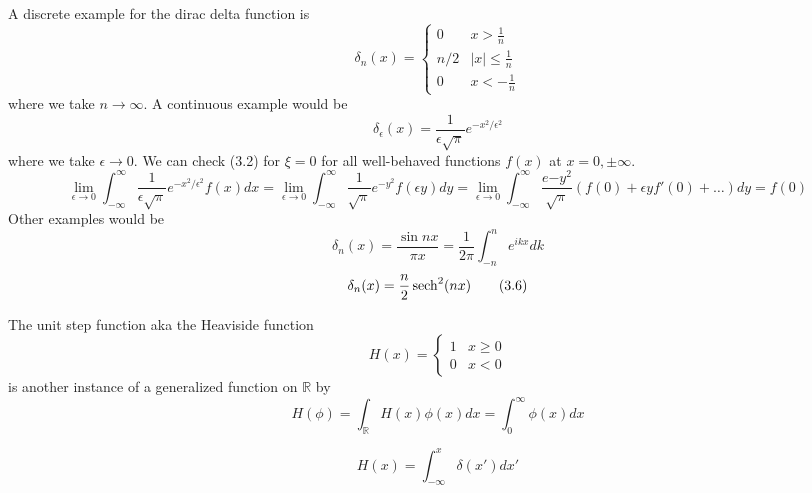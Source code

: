\documentclass[a4paper]{article}
\begin{document}
\begin{eg}
A discrete example for the dirac delta function is
\begin{equation}
   \delta_n(x)=
\left\{
        \begin{array}{ll}
      0 &x>\frac{1}{n}\\
      n/2 & |x|\leq\frac{1}{n}\\
      0 & x<-\frac{1}{n}
        \end{array}
    \right.\tag{3.4a} 
\end{equation}
where we take $n\rightarrow\infty$. A continuous example would be
\begin{equation}
    \delta_\epsilon(x)=\frac{1}{\epsilon\sqrt{\pi}}e^{-x^2/\epsilon^2}\tag{3.4b}
\end{equation}
where we take $\epsilon\rightarrow 0$. We can check (3.2) for $\xi=0$ for all well-behaved functions $f(x)$ at $x=0,\pm\infty$.
$$\lim_{\epsilon\rightarrow 0}\int_{-\infty}^\infty\frac{1}{\epsilon\sqrt{\pi}}e^{-x^2/\epsilon^2}f(x)dx=\lim_{\epsilon\rightarrow 0}\int_{-\infty}^\infty\frac{1}{\sqrt{\pi}}e^{-y^2}f(\epsilon y)dy=\lim_{\epsilon\rightarrow0}\int_{-\infty}^\infty\frac{e{-y^2}}{\sqrt{\pi}}(f(0)+\epsilon yf'(0)+\dots)dy=f(0)$$
Other examples would be
\begin{equation}
    \delta_n(x)=\frac{\sin nx}{\pi x}=\frac{1}{2\pi}\int_{-n}^ne^{ikx}dk\tag{3.5}
\end{equation}
\begin{equation}
    \delta_n(x)=\frac{n}{2}\operatorname{sech}^2(nx)\tag{3.6}
\end{equation}
\end{eg}
\begin{defi}
The unit step function aka the Heaviside function
\begin{equation}
   H(x)=
\left\{
        \begin{array}{ll}
      1 & x\geq0\\
      0 & x<0
        \end{array}
    \right.\tag{3.7} 
\end{equation}
is another instance of a generalized function on $\mathbb{R}$ by
$$H(\phi)=\int_{\mathbb{R}}H(x)\phi(x)dx=\int_0^\infty\phi(x)dx$$
\end{defi}
\begin{prop}
\begin{equation}
    H(x)=\int_{-\infty}^x\delta(x')dx'\tag{3.8}
\end{equation}
\end{prop}
\end{document}
